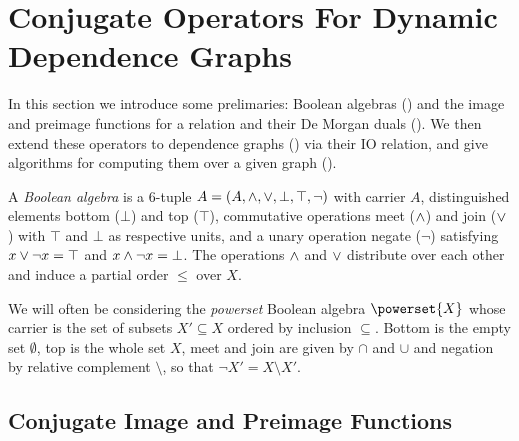 \section{Conjugate Operators For Dynamic Dependence Graphs}
\label{sec:conjugate}

In this section we introduce some prelimaries: Boolean algebras () and the
image and preimage functions for a relation and their De Morgan duals (). We
then extend these operators to dependence graphs () via their IO
relation, and give algorithms for computing them over a given graph
(). 

\begin{definition}
\label{def:conjugate:Boolean-algebra}
A \emph{Boolean algebra} is a 6-tuple $A = (A, \wedge, \vee, \bot, \top, \neg)$ with carrier $A$,
distinguished elements bottom ($\bot$) and top ($\top$), commutative operations meet ($\wedge$) and join
($\vee$) with $\top$ and $\bot$ as respective units, and a unary operation negate ($\neg$) satisfying $x
\vee \neg x = \top$ and $x \wedge \neg x = \bot$. The operations $\wedge$ and $\vee$ distribute over each
other and induce a partial order $\leq$ over $X$.
\end{definition}

We will often be considering the \emph{powerset} Boolean algebra $\powerset{X}$ whose carrier is the set of
subsets $X' \subseteq X$ ordered by inclusion $\subseteq$. Bottom is the empty set $\emptyset$, top is the
whole set $X$, meet and join are given by $\cap$ and $\cup$ and negation by relative complement $\setminus$,
so that $\neg X' = X \setminus X'$.

%

\subsection{Conjugate Image and Preimage Functions}
\label{sec:conjugate:image-preimage}

